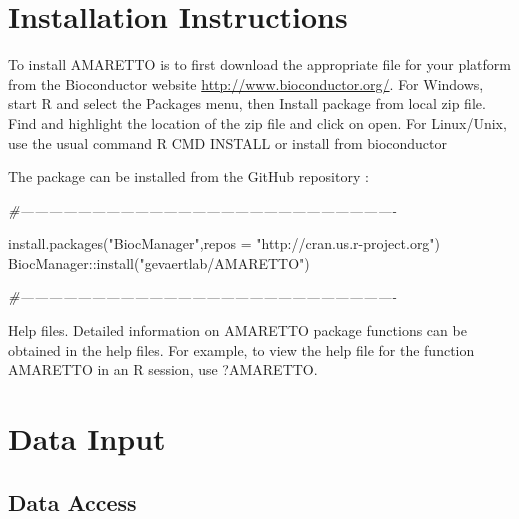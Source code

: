 \documentclass[8pt,a4,]{article}
\newcommand{\hlstr}[1]{\textcolor[rgb]{0.251,0.627,0.251}{#1}}%
\newcommand{\hlcom}[1]{\textcolor[rgb]{0.502,0.502,0.502}{\textit{#1}}}%
\newcommand{\hlopt}[1]{\textcolor[rgb]{0,0,0}{#1}}%
\newcommand{\hlstd}[1]{\textcolor[rgb]{0.251,0.251,0.251}{#1}}%
\newcommand{\hlkwc}[1]{\textcolor[rgb]{0.251,0.251,0.251}{#1}}%
\newcommand{\hlkwd}[1]{\textcolor[rgb]{0.878,0.439,0.125}{#1}}%
\newenvironment{Shaded}{\begin{myshaded}}{\end{myshaded}}
\newcommand{\KeywordTok}[1]{\hlkwd{#1}}
\newcommand{\DataTypeTok}[1]{\hlkwc{#1}}
\newcommand{\StringTok}[1]{\hlstr{#1}}
\newcommand{\CommentTok}[1]{\hlcom{#1}}
\newcommand{\OperatorTok}[1]{\hlopt{#1}}
\newcommand{\NormalTok}[1]{\hlstd{#1}}
\begin{document}
\section{Installation Instructions}\label{installation-instructions}

To install AMARETTO is to first download the appropriate file for your
platform from the Bioconductor website
\url{http://www.bioconductor.org/}. For Windows, start R and select the
Packages menu, then Install package from local zip file. Find and
highlight the location of the zip file and click on open. For
Linux/Unix, use the usual command R CMD INSTALL or install from
bioconductor

The package can be installed from the GitHub repository :

\begin{Shaded}
\begin{Highlighting}[]
\CommentTok{#-------------------------------------------------------------------------------}

\KeywordTok{install.packages}\NormalTok{(}\StringTok{"BiocManager"}\NormalTok{,}\DataTypeTok{repos =} \StringTok{"http://cran.us.r-project.org"}\NormalTok{)}
\NormalTok{BiocManager}\OperatorTok{::}\KeywordTok{install}\NormalTok{(}\StringTok{"gevaertlab/AMARETTO"}\NormalTok{)}

\CommentTok{#-------------------------------------------------------------------------------}
\end{Highlighting}
\end{Shaded}

Help files. Detailed information on AMARETTO package functions can be
obtained in the help files. For example, to view the help file for the
function AMARETTO in an R session, use ?AMARETTO.

\section{Data Input}\label{data-input}

\subsection{Data Access}\label{data-access}
\end{document}
